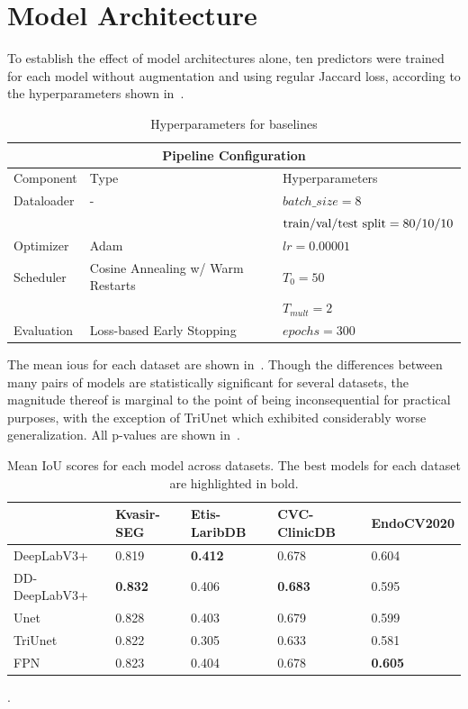 \section{Model Architecture} \label{models}
To establish the effect of model architectures alone, ten predictors were trained for each model without augmentation and using regular Jaccard loss, according to the hyperparameters shown in~. 
\begin{table}[htb]
        \centering
        \begin{tabularx}{\linewidth}{llX}
        \toprule
        \multicolumn{3}{c}{\textbf{Pipeline Configuration}}\\
        \toprule
        Component & Type & Hyperparameters \\
        \midrule
        Dataloader & - & \(batch\_size = 8\) \\
        && \(\hbox{train/val/test split} = 80/10/10\)\\
        \midrule
        Optimizer & Adam & \(lr = 0.00001\)\\
        \midrule
        Scheduler & Cosine Annealing w/ Warm Restarts & \(T_0=50\) \\
        & & \(T_{mult}=2\) \\
        \midrule
        Evaluation & Loss-based Early Stopping & \(epochs=300\)\\
        \bottomrule
        \end{tabularx}
            \caption{Hyperparameters for baselines}
            \label{table:hyperparameters}
\end{table}

The mean \glspl{iou} for each dataset are shown in~. Though the differences between many pairs of models are statistically significant for several datasets, the magnitude thereof is marginal to the point of being inconsequential for practical purposes, with the exception of TriUnet which exhibited considerably worse generalization. All p-values are shown in~.

\begin{table}[htb]
    \centering
    \small
    \begin{tabularx}{\linewidth}{@{}lXXXX@{}}
    \toprule
    & Kvasir-SEG & Etis-LaribDB & CVC-ClinicDB & EndoCV2020 \\
    \midrule
    DeepLabV3+ & 0.819 & \textbf{0.412}  & 0.678 & 0.604 \\
    DD-DeepLabV3+ &\textbf{0.832} & 0.406 & \textbf{0.683} & 0.595 \\
    Unet & 0.828 & 0.403 & 0.679 & 0.599 \\
    TriUnet & 0.822 & 0.305 & 0.633 & 0.581 \\
    FPN& 0.823 & 0.404 &0.678 & \textbf{0.605}\\
    \bottomrule
    \end{tabularx}
.    \caption[Mean IoU scores for each model across datasets]{Mean IoU scores for each model across datasets. The best models for each dataset are highlighted in bold.}
    \label{tab:baseline_iou}
\end{table}

